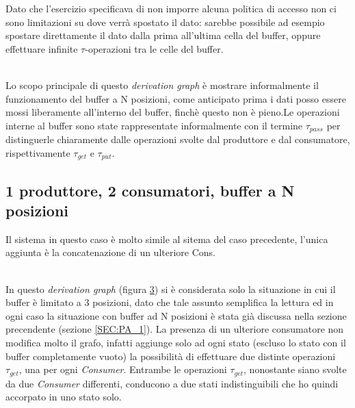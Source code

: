 \documentclass[a4paper]{article}
\begin{document}
Dato che l'esercizio specificava di non imporre alcuna politica di accesso non ci sono limitazioni su dove verrà spostato il dato: sarebbe possibile ad esempio spostare direttamente il dato dalla prima all'ultima cella del buffer, oppure effettuare infinite $\tau$-operazioni tra le celle del buffer.\\
\begin{figure}[!ht]
  \label{FIG:ES3Setting1DG}
\end{figure}\\
Lo scopo principale di questo \textit{derivation graph} è mostrare informalmente il funzionamento del buffer a N posizioni, come anticipato prima i dati posso essere mossi liberamente all'interno del buffer, finchè questo non è pieno.Le operazioni interne al buffer sono state rappresentate informalmente con il termine $\tau_{pass}$ per distinguerle chiaramente dalle operazioni svolte dal produttore e dal consumatore, rispettivamente $\tau_{get}$ e $\tau_{put}$.


\subsection{1 produttore, 2 consumatori, buffer a N posizioni}
Il sistema in questo caso è molto simile al sitema del caso precedente, l'unica aggiunta è la concatenazione di un ulteriore Cons.\\
\begin{figure}[!ht]
  \label{FIG:ES3Setting2SYS}
\end{figure}
\begin{figure}[!ht]
  \label{FIG:ES3Setting2DG}
\end{figure}\\
In questo \textit{derivation graph} (figura \ref{FIG:ES3Setting2DG}) si è considerata solo la situazione in cui il buffer è limitato a 3 posizioni, dato che tale assunto semplifica la lettura ed in ogni caso la situazione con buffer ad N posizioni è stata già discussa nella sezione precendente (sezione \ref{SEC:PA_1}).
La presenza di un ulteriore consumatore non modifica molto il grafo, infatti aggiunge solo ad ogni stato (escluso lo stato con il buffer completamente vuoto) la possibilità di effettuare due distinte operazioni $\tau_{get}$, una per ogni \textit{Consumer}.
Entrambe le operazioni $\tau_{get}$, nonostante siano svolte da due \textit{Consumer} differenti, conducono a due stati indistinguibili che ho quindi accorpato in uno stato solo.
\end{document}
